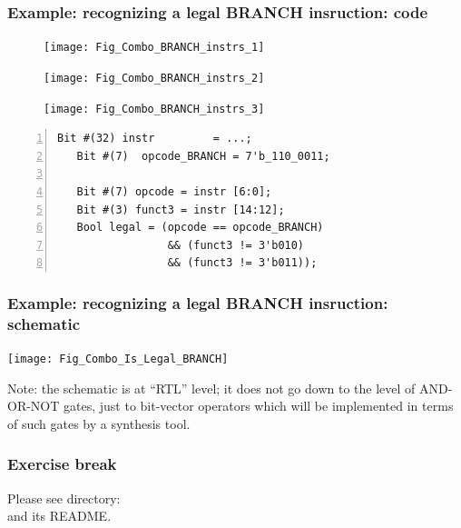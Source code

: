 
\begin{frame}[fragile]
\frametitle{Example: recognizing a legal BRANCH insruction: code}

\footnotesize

\begin{figure}[htbp]
  \centerline{\texttt{[image: Fig\_Combo\_BRANCH\_instrs\_1]}}
  \centerline{\texttt{[image: Fig\_Combo\_BRANCH\_instrs\_2]}}
  \vspace{2mm}
  \centerline{\texttt{[image: Fig\_Combo\_BRANCH\_instrs\_3]}}
\end{figure}

\begin{Verbatim}[frame=single, numbers=left]
   Bit #(32) instr         = ...;
   Bit #(7)  opcode_BRANCH = 7'b_110_0011;

   Bit #(7) opcode = instr [6:0];
   Bit #(3) funct3 = instr [14:12];
   Bool legal = (opcode == opcode_BRANCH)
                 && (funct3 != 3'b010)
                 && (funct3 != 3'b011));
\end{Verbatim}

\end{frame}


\begin{frame}[fragile]
\frametitle{Example: recognizing a legal BRANCH insruction: schematic}

\footnotesize

\begin{center}
 \texttt{[image: Fig\_Combo\_Is\_Legal\_BRANCH]}
\end{center}

\vfill

Note: the schematic is at ``RTL'' level; it does not go down to the
level of AND-OR-NOT gates, just to bit-vector operators which will be
implemented in terms of such gates by a synthesis tool.

\end{frame}


\begin{frame}[fragile]
\frametitle{\EmojiExercise \hmm Exercise break}

Please see directory:  \\
and its README.

\end{frame}

